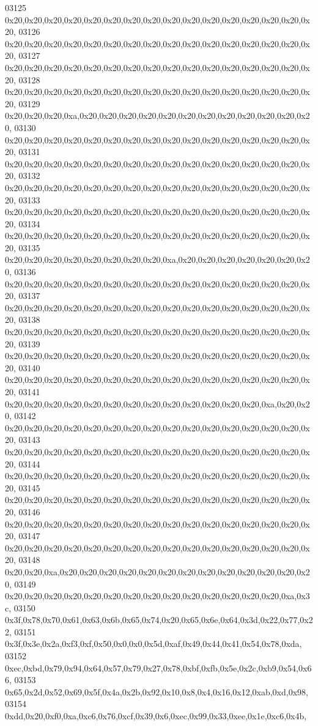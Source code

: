 \begin{DoxyCode}
03125   0x20,0x20,0x20,0x20,0x20,0x20,0x20,0x20,0x20,0x20,0x20,0x20,0x20,0x20,0x20,0x20,
03126   0x20,0x20,0x20,0x20,0x20,0x20,0x20,0x20,0x20,0x20,0x20,0x20,0x20,0x20,0x20,0x20,
03127   0x20,0x20,0x20,0x20,0x20,0x20,0x20,0x20,0x20,0x20,0x20,0x20,0x20,0x20,0x20,0x20,
03128   0x20,0x20,0x20,0x20,0x20,0x20,0x20,0x20,0x20,0x20,0x20,0x20,0x20,0x20,0x20,0x20,
03129   0x20,0x20,0x20,0xa,0x20,0x20,0x20,0x20,0x20,0x20,0x20,0x20,0x20,0x20,0x20,0x20,
03130   0x20,0x20,0x20,0x20,0x20,0x20,0x20,0x20,0x20,0x20,0x20,0x20,0x20,0x20,0x20,0x20,
03131   0x20,0x20,0x20,0x20,0x20,0x20,0x20,0x20,0x20,0x20,0x20,0x20,0x20,0x20,0x20,0x20,
03132   0x20,0x20,0x20,0x20,0x20,0x20,0x20,0x20,0x20,0x20,0x20,0x20,0x20,0x20,0x20,0x20,
03133   0x20,0x20,0x20,0x20,0x20,0x20,0x20,0x20,0x20,0x20,0x20,0x20,0x20,0x20,0x20,0x20,
03134   0x20,0x20,0x20,0x20,0x20,0x20,0x20,0x20,0x20,0x20,0x20,0x20,0x20,0x20,0x20,0x20,
03135   0x20,0x20,0x20,0x20,0x20,0x20,0x20,0x20,0xa,0x20,0x20,0x20,0x20,0x20,0x20,0x20,
03136   0x20,0x20,0x20,0x20,0x20,0x20,0x20,0x20,0x20,0x20,0x20,0x20,0x20,0x20,0x20,0x20,
03137   0x20,0x20,0x20,0x20,0x20,0x20,0x20,0x20,0x20,0x20,0x20,0x20,0x20,0x20,0x20,0x20,
03138   0x20,0x20,0x20,0x20,0x20,0x20,0x20,0x20,0x20,0x20,0x20,0x20,0x20,0x20,0x20,0x20,
03139   0x20,0x20,0x20,0x20,0x20,0x20,0x20,0x20,0x20,0x20,0x20,0x20,0x20,0x20,0x20,0x20,
03140   0x20,0x20,0x20,0x20,0x20,0x20,0x20,0x20,0x20,0x20,0x20,0x20,0x20,0x20,0x20,0x20,
03141   0x20,0x20,0x20,0x20,0x20,0x20,0x20,0x20,0x20,0x20,0x20,0x20,0x20,0xa,0x20,0x20,
03142   0x20,0x20,0x20,0x20,0x20,0x20,0x20,0x20,0x20,0x20,0x20,0x20,0x20,0x20,0x20,0x20,
03143   0x20,0x20,0x20,0x20,0x20,0x20,0x20,0x20,0x20,0x20,0x20,0x20,0x20,0x20,0x20,0x20,
03144   0x20,0x20,0x20,0x20,0x20,0x20,0x20,0x20,0x20,0x20,0x20,0x20,0x20,0x20,0x20,0x20,
03145   0x20,0x20,0x20,0x20,0x20,0x20,0x20,0x20,0x20,0x20,0x20,0x20,0x20,0x20,0x20,0x20,
03146   0x20,0x20,0x20,0x20,0x20,0x20,0x20,0x20,0x20,0x20,0x20,0x20,0x20,0x20,0x20,0x20,
03147   0x20,0x20,0x20,0x20,0x20,0x20,0x20,0x20,0x20,0x20,0x20,0x20,0x20,0x20,0x20,0x20,
03148   0x20,0x20,0xa,0x20,0x20,0x20,0x20,0x20,0x20,0x20,0x20,0x20,0x20,0x20,0x20,0x20,
03149   0x20,0x20,0x20,0x20,0x20,0x20,0x20,0x20,0x20,0x20,0x20,0x20,0x20,0x20,0xa,0x3c,
03150   0x3f,0x78,0x70,0x61,0x63,0x6b,0x65,0x74,0x20,0x65,0x6e,0x64,0x3d,0x22,0x77,0x22,
03151   0x3f,0x3e,0x2a,0xf3,0xf,0x50,0x0,0x0,0x5d,0xaf,0x49,0x44,0x41,0x54,0x78,0xda,
03152   0xec,0xbd,0x79,0x94,0x64,0x57,0x79,0x27,0x78,0xbf,0xfb,0x5e,0x2c,0xb9,0x54,0x66,
03153   0x65,0x2d,0x52,0x69,0x5f,0x4a,0x2b,0x92,0x10,0x8,0x4,0x16,0x12,0xab,0xd,0x98,
03154   0xdd,0x20,0xf0,0xa,0xc6,0x76,0xcf,0x39,0x6,0xec,0x99,0x33,0xee,0x1e,0xc6,0x4b,

\end{DoxyCode}
